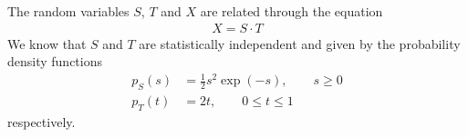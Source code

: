 \ifspanish

\else

The random variables $S$, $T$ and $X$ are related through the equation
\begin{align*}
X = S \cdot T
\end{align*}
We know that $S$ and $T$ are statistically independent and given by the probability density functions
\begin{align*}
p_{S}(s) &= \frac{1}{2} s^2 \exp(- s),   \qquad s \ge 0  \\
p_{T}(t) &= 2t,					        \qquad 0 \le t \le 1
\end{align*}
respectively.



